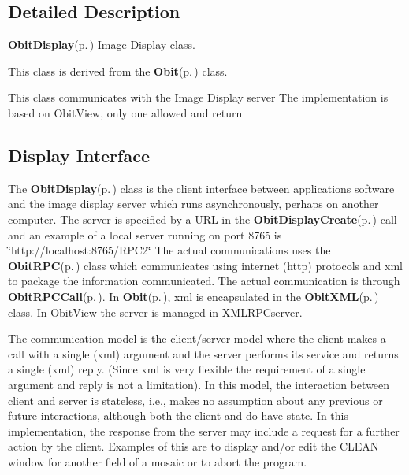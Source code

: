 \subsection{Detailed Description}
{\bf Obit\-Display}{\rm (p.\,\pageref{structObitDisplay})} Image Display class. 

This class is derived from the {\bf Obit}{\rm (p.\,\pageref{structObit})} class.

This class communicates with the Image Display server The implementation is based on Obit\-View, only one allowed and return\subsection{Display Interface}\label{ObitDisplay_8h_ObitDisplay}
The {\bf Obit\-Display}{\rm (p.\,\pageref{structObitDisplay})} class is the client interface between applications software and the image display server which runs asynchronously, perhaps on another computer. The server is specified by a URL in the {\bf Obit\-Display\-Create}{\rm (p.\,\pageref{ObitDisplay_8c_a14})} call and an example of a local server running on port 8765 is \char`\"{}http://localhost:8765/RPC2\char`\"{} The actual communications uses the {\bf Obit\-RPC}{\rm (p.\,\pageref{structObitRPC})} class which communicates using internet (http) protocols and xml to package the information communicated. The actual communication is through {\bf Obit\-RPCCall}{\rm (p.\,\pageref{ObitRPC_8c_a11})}. In {\bf Obit}{\rm (p.\,\pageref{structObit})}, xml is encapsulated in the {\bf Obit\-XML}{\rm (p.\,\pageref{structObitXML})} class. In Obit\-View the server is managed in XMLRPCserver.

The communication model is the client/server model where the client makes a call with a single (xml) argument and the server performs its service and returns a single (xml) reply. (Since xml is very flexible the requirement of a single argument and reply is not a limitation). In this model, the interaction between client and server is stateless, i.e., makes no assumption about any previous or future interactions, although both the client and do have state. In this implementation, the response from the server may include a request for a further action by the client. Examples of this are to display and/or edit the CLEAN window for another field of a mosaic or to abort the program.

